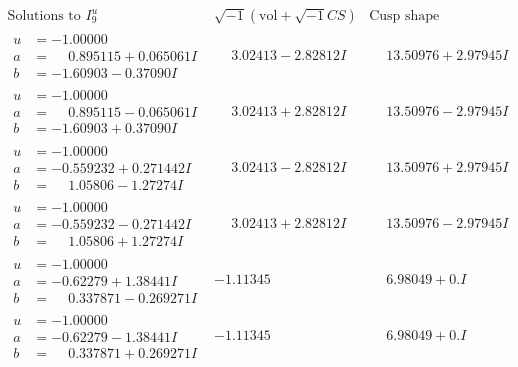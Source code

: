 \documentclass[1p]{elsarticle_modified}
\theoremstyle{definition}
\newcommand{\I}{\sqrt{-1}}
\begin{document}
$$\begin{array}{c|c|c}  
\text{Solutions to }I^u_{9}& \I (\text{vol} + \sqrt{-1}CS) & \text{Cusp shape}\\
 \hline 
\begin{aligned}
u &= -1.00000\phantom{ +0.000000I} \\
a &= \phantom{-}0.895115 + 0.065061 I \\
b &= -1.60903 - 0.37090 I\end{aligned}
 & \phantom{-}3.02413 - 2.82812 I & \phantom{-}13.50976 + 2.97945 I \\ \hline\begin{aligned}
u &= -1.00000\phantom{ +0.000000I} \\
a &= \phantom{-}0.895115 - 0.065061 I \\
b &= -1.60903 + 0.37090 I\end{aligned}
 & \phantom{-}3.02413 + 2.82812 I & \phantom{-}13.50976 - 2.97945 I \\ \hline\begin{aligned}
u &= -1.00000\phantom{ +0.000000I} \\
a &= -0.559232 + 0.271442 I \\
b &= \phantom{-}1.05806 - 1.27274 I\end{aligned}
 & \phantom{-}3.02413 - 2.82812 I & \phantom{-}13.50976 + 2.97945 I \\ \hline\begin{aligned}
u &= -1.00000\phantom{ +0.000000I} \\
a &= -0.559232 - 0.271442 I \\
b &= \phantom{-}1.05806 + 1.27274 I\end{aligned}
 & \phantom{-}3.02413 + 2.82812 I & \phantom{-}13.50976 - 2.97945 I \\ \hline\begin{aligned}
u &= -1.00000\phantom{ +0.000000I} \\
a &= -0.62279 + 1.38441 I \\
b &= \phantom{-}0.337871 - 0.269271 I\end{aligned}
 & -1.11345\phantom{ +0.000000I} & \phantom{-}6.98049 + 0. I\phantom{ +0.000000I} \\ \hline\begin{aligned}
u &= -1.00000\phantom{ +0.000000I} \\
a &= -0.62279 - 1.38441 I \\
b &= \phantom{-}0.337871 + 0.269271 I\end{aligned}
 & -1.11345\phantom{ +0.000000I} & \phantom{-}6.98049 + 0. I\phantom{ +0.000000I} \\ \hline\begin{aligned}

\end{aligned}
\end{array}$$
\end{document}
